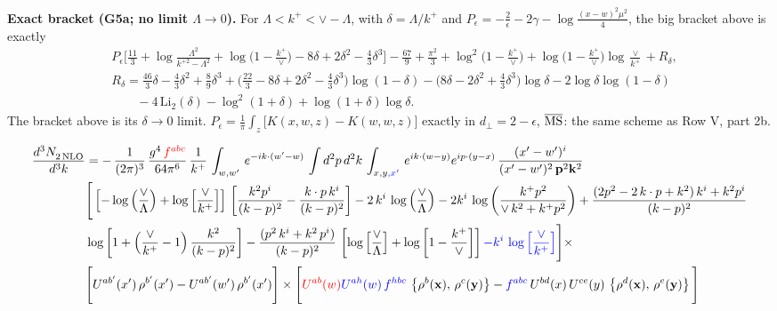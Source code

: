 \documentclass[9pt]{article}
\numberwithin{equation}{section}
\begin{document}
\begingroup\color{blue}\noindent\textbf{Exact bracket (G5a; no limit $\Lambda\to0$).} For $\Lambda<k^{+}<\vee-\Lambda$, with $\delta=\Lambda/k^{+}$ and $P_{\epsilon}=-\frac{2}{\epsilon}-2\gamma-\log\frac{(x-w)^{2}\mu^{2}}{4}$, the big bracket above is exactly
\begin{align*}
&P_{\epsilon}\Big[\frac{11}{3}+\log\frac{\Lambda^{2}}{k^{+2}-\Lambda^{2}}+\log\Big(1-\frac{k^{+}}{\vee}\Big)-8\delta+2\delta^{2}-\frac{4}{3}\delta^{3}\Big]-\frac{67}{9}+\frac{\pi^{2}}{3}+\log^{2}\Big(1-\frac{k^{+}}{\vee}\Big)+\log\Big(1-\frac{k^{+}}{\vee}\Big)\log\frac{\vee}{k^{+}}+R_{\delta},\\
&R_{\delta}=\frac{46}{3}\delta-\frac{4}{3}\delta^{2}+\frac{8}{9}\delta^{3}+\Big(\frac{22}{3}-8\delta+2\delta^{2}-\frac{4}{3}\delta^{3}\Big)\log(1-\delta)-\Big(8\delta-2\delta^{2}+\frac{4}{3}\delta^{3}\Big)\log\delta-2\log\delta\log(1-\delta)\\
&\qquad-4\,\mathrm{Li}_{2}(\delta)-\log^{2}(1+\delta)+\log(1+\delta)\log\delta .
\end{align*}
The bracket above is its $\delta\to0$ limit. $P_{\epsilon}=\frac{1}{\pi}\int_{z}\big[K(x,w,z)-K(w,w,z)\big]$ exactly in $d_{\perp}=2-\epsilon$, $\overline{\rm MS}$: the same scheme as Row V, part 2b.\par\endgroup
\begin{align}
   \frac{d^{3}N_{2\,\rm NLO}^{\rm}}{d^{3}k} &  = -\,\frac{1}{(2\pi)^{3}}\,\frac{g^{4}\,{\color{red}f^{abc}}}{64\pi^{6}}\, \frac{1}{k^{+}}\,\int_{w,w'}\, e^{-ik\cdot (w'-w)}\,\int d^{2}p\,d^{2}k\,\int_{x,y{\color{blue},x^{\prime}}}\, e^{ik\cdot (w-y)} e^{ip\cdot (y-x)}\, \frac{(x'-w')^{i}}{(x'-w')^{2}\,\mathbf{p}^{2}\mathbf{k}^{2} }\notag \\ & \Bigg[\left[-\log{\left(\frac{\vee}{\Lambda}\right)}+\log{\left[\frac{\vee}{k^{+}}\right]}\right]\,\left[\frac{k^{2}p^{i}}{(k-p)^{2}}-\frac{k\cdot p\,k^{i}}{(k-p)^{2}}\right]-2\,k^{i}\,\log{\left(\frac{\vee}{\Lambda}\right)} -2k^{i}\,\log{\left(\frac{k^{+}p^{2}}{\vee\, k^{2}+k^{+}p^{2}}\right)}+\frac{(2p^{2}-2\,k\cdot p + k^{2})\,k^{i} + k^{2}p^{i}}{(k-p)^{2}}\notag \\ &  \log{\left[1+\left(\frac{\vee}{k^{+}}-1\right)\frac{k^{2}}{(k-p)^{2}}\right]} - \frac{(p^{2}\,k^{i}+k^{2}\,p^{i})}{(k-p)^{2}}\,\left[\log{\left[\frac{\vee}{\Lambda}\right]}+\log{\left[1-\frac{k^{+}}{\vee}\right]}\right]{\color{blue}-k^{i}\,\log{\left[\frac{\vee}{k^{+}}\right]}}\Bigg]\times\,\notag \\ &  \Bigg[U^{ab'}(x')\,\rho^{b'}(x') - U^{ab'}(w')\,\rho^{b'}(x')\Bigg]\times\Bigg[{\color{red}U^{ab}(w)}{\color{blue}U^{ah}(w)\,f^{hbc}}\,\left\{ \rho^{b}(\mathbf{x}),\,\rho^{c}(\mathbf{y})\right\}-{\color{blue}f^{abc}}\,U^{bd}(x)\, U^{ce}(y)\, \left\{\rho^{d}(\mathbf{x}),\,\rho^{e}(\mathbf{y})\right\}\Bigg]
\end{align}
\end{document}
